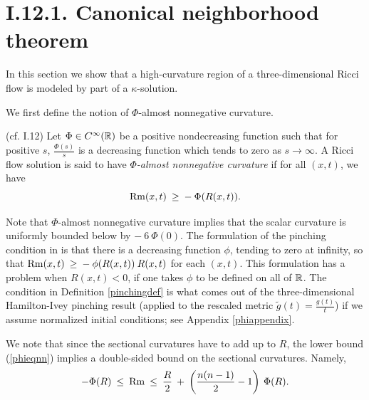 \section{I.12.1. Canonical neighborhood theorem}
\label{I.12.1}

In this section we show that a high-curvature region of a three-dimensional
Ricci flow is modeled by part of a $\kappa$-solution.


We first define the notion of $\Phi$-almost nonnegative curvature.

\begin{definition}
  \label{def:kl-canonical-neighborhood-theorem-almost-nonnegative-curvature}
 (cf. I.12) \label{pinchingdef}
Let $\Phi \in C^\infty({\mathbb R})$ be a positive nondecreasing function
such that
for positive $s$, $\frac{\Phi(s)}{s}$ is a decreasing function which
tends to zero as $s \rightarrow \infty$.
A Ricci flow solution is said to have {\em $\Phi$-almost nonnegative
curvature} if for all $(x,t)$, we have
\begin{equation} \label{phieqnn}
\operatorname{Rm}(x,t) \: \ge \: - \: \Phi(R(x,t)).
\end{equation}
\end{definition}

\begin{remark}
  \label{rem:kl-canonical-neighborhood-theorem-existence-canonical-neighborhoods}

Note that $\Phi$-almost nonnegative curvature implies that the scalar curvature is uniformly
bounded below by $- \: 6 \: \Phi(0)$.
The formulation of the pinching condition in \cite[Section 12]{Perelman}
is that there is a decreasing function $\phi$, tending to zero at infinity,
so that $\operatorname{Rm}(x,t) \: \ge \: - \: \phi(R(x,t)) \: R(x,t)$ for each
$(x,t)$. This formulation has a problem when $R(x,t) < 0$, if one
takes $\phi$ to be defined on all of ${\mathbb R}$. The condition in
Definition \ref{pinchingdef} is what comes out of the
three-dimensional
Hamilton-Ivey pinching result (applied to the rescaled metric
$\tilde{g}(t) = \frac{g(t)}{t}$) if we assume normalized initial
conditions; see Appendix \ref{phiappendix}.
\end{remark}

We note that since the sectional curvatures have to add up to
$R$, the lower bound (\ref{phieqnn}) implies a double-sided bound on the
sectional curvatures.  Namely,
\begin{equation} \label{double}
- \Phi(R) \: \le \:
\operatorname{Rm} \: \le \: \frac{R}{2} \: + \: \left( \frac{n(n-1)}{2} - 1 \right)
\: \Phi(R).
\end{equation}

